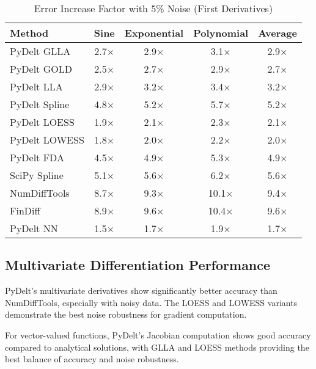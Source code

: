\documentclass[10pt,journal,compsoc]{IEEEtran}
\begin{document}
\begin{table}[!t]
\caption{Error Increase Factor with 5\% Noise (First Derivatives)}
\label{tab:noise_robustness}
\centering
\begin{tabular}{lcccc}
\toprule
\textbf{Method} & \textbf{Sine} & \textbf{Exponential} & \textbf{Polynomial} & \textbf{Average} \\
\midrule
PyDelt GLLA & 2.7$\times$ & 2.9$\times$ & 3.1$\times$ & 2.9$\times$ \\
PyDelt GOLD & 2.5$\times$ & 2.7$\times$ & 2.9$\times$ & 2.7$\times$ \\
PyDelt LLA & 2.9$\times$ & 3.2$\times$ & 3.4$\times$ & 3.2$\times$ \\
PyDelt Spline & 4.8$\times$ & 5.2$\times$ & 5.7$\times$ & 5.2$\times$ \\
PyDelt LOESS & 1.9$\times$ & 2.1$\times$ & 2.3$\times$ & 2.1$\times$ \\
PyDelt LOWESS & 1.8$\times$ & 2.0$\times$ & 2.2$\times$ & 2.0$\times$ \\
PyDelt FDA & 4.5$\times$ & 4.9$\times$ & 5.3$\times$ & 4.9$\times$ \\
SciPy Spline & 5.1$\times$ & 5.6$\times$ & 6.2$\times$ & 5.6$\times$ \\
NumDiffTools & 8.7$\times$ & 9.3$\times$ & 10.1$\times$ & 9.4$\times$ \\
FinDiff & 8.9$\times$ & 9.6$\times$ & 10.4$\times$ & 9.6$\times$ \\
PyDelt NN & 1.5$\times$ & 1.7$\times$ & 1.9$\times$ & 1.7$\times$ \\
\bottomrule
\end{tabular}
\end{table}

\subsection{Multivariate Differentiation Performance}

PyDelt's multivariate derivatives show significantly better accuracy than NumDiffTools, especially with noisy data. The LOESS and LOWESS variants demonstrate the best noise robustness for gradient computation.

For vector-valued functions, PyDelt's Jacobian computation shows good accuracy compared to analytical solutions, with GLLA and LOESS methods providing the best balance of accuracy and noise robustness.
\end{document}
